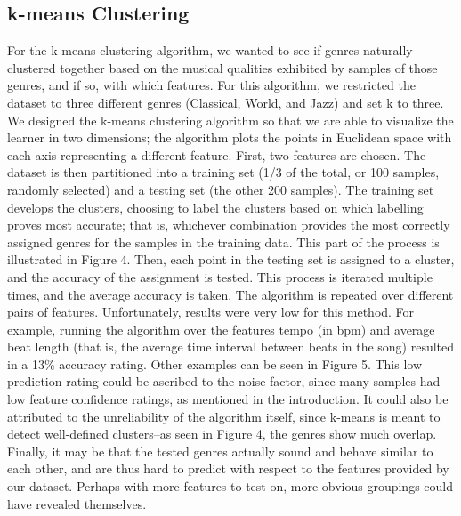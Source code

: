 \documentclass[11pt, twocolumn]{article}
\begin{document}
\subsection{k-means Clustering}
    For the k-means clustering algorithm, we wanted to see if genres naturally clustered together based on the musical qualities exhibited by samples of those genres, and if so, with which features. For this algorithm, we restricted the dataset to three different genres (Classical, World, and Jazz) and set k to three. We designed the k-means clustering algorithm so that we are able to visualize the learner in two dimensions; the algorithm plots the points in Euclidean space with each axis representing a different feature.
    First, two features are chosen. The dataset is then partitioned into a training set (1/3 of the total, or 100 samples, randomly selected) and a testing set (the other 200 samples). The training set develops the clusters, choosing to label the clusters based on which labelling proves most accurate; that is, whichever combination provides the most correctly assigned genres for the samples in the training data. This part of the process is illustrated in Figure 4. Then, each point in the testing set is assigned to a cluster, and the accuracy of the assignment is tested. This process is iterated multiple times, and the average accuracy is taken. The algorithm is repeated over different pairs of features.
    Unfortunately, results were very low for this method. For example, running the algorithm over the features tempo (in bpm) and average beat length (that is, the average time interval between beats in the song) resulted in a 13\% accuracy rating. Other examples can be seen in Figure 5. This low prediction rating could be ascribed to the noise factor, since many samples had low feature confidence ratings, as mentioned in the introduction. It could also be attributed to the unreliability of the algorithm itself, since k-means is meant to detect well-defined clusters--as seen in Figure 4, the genres show much overlap. Finally, it may be that the tested genres actually sound and behave similar to each other, and are thus hard to predict with respect to the features provided by our dataset. Perhaps with more features to test on, more obvious groupings could have revealed themselves.
\end{document}
